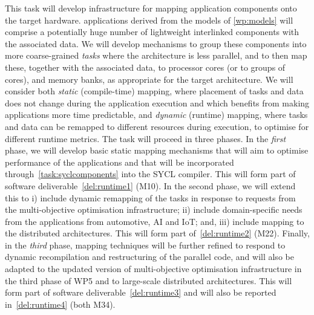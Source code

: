 \begin{Workpackage}{\thewpno}
\begin{Task}
\TaskResults{
\ref{del:runtime1}
\ref{del:runtime2}
\ref{del:runtime3}
\ref{del:runtime4}
}%
\TaskHeader{}
This task will develop infrastructure for mapping application components onto the 
target hardware. \TheProject{} applications derived from the models of \ref{wp:models}
will comprise a potentially huge number of lightweight interlinked components with the associated data.
We will develop mechanisms to group these components into more coarse-grained \emph{tasks} where the architecture is less parallel,
and to then map these, together with the associated data, to processor cores (or to groups of cores), and memory banks, as appropriate for the target architecture. 
We will consider both \emph{static} (compile-time) mapping, where placement of tasks and data does not change during the application
execution and which benefits from making applications more time predictable, and 
\emph{dynamic} (runtime) mapping, where tasks and data can be remapped  to different resources during
execution, to optimise for different runtime metrics. The task will
proceed in three phases. In the \emph{first} phase, we will develop basic static mapping mechanisms
that will aim to optimise performance of the applications and that will be incorporated through~\ref{task:syclcomponents} into the SYCL compiler. This will form  part of software deliverable~\ref{del:runtime1} (M10). In the second phase, we will
extend this to i) include dynamic remapping of the tasks in response to requests from
the multi-objective optimisation infrastructure; ii) include domain-specific needs from the applications from automotive, AI and IoT; and, iii) include mapping to the distributed architectures. This will form part of~\ref{del:runtime2} (M22). Finally,
in the \emph{third} phase, mapping techniques will be further refined to respond to dynamic
recompilation and restructuring of the parallel code, and will also be adapted to the
updated version of multi-objective optimisation infrastructure in the third phase of 
WP5 and to large-scale distributed architectures. 
This will form part of software deliverable~\ref{del:runtime3} and will also be reported in~\ref{del:runtime4} (both M34).
\end{Task}


\end{Workpackage}
